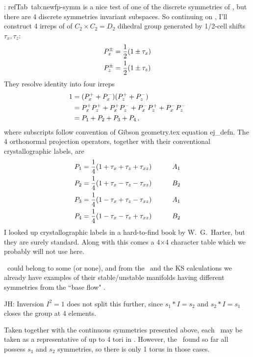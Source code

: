 :
 refTab~{tab:newfp-symm}
is a nice test of one of the discrete symmetries of \pCf, but
there are 4 discrete symmetries invariant subspaces.
So continuing on
, I'll construct 4 irreps of
of $C_2 \times C_2 = D_2$ dihedral group generated by 1/2-cell
shifts $\tau_x, \tau_z$:
\begin{align}
P_x^\pm &= \frac{1}{2}(1 \pm \tau_x)
    \nonumber \\ 
P_z^\pm &= \frac{1}{2}(1 \pm \tau_z)
\end{align}
They resolve identity into four irreps
\begin{align}
1 &= ({P}_x^+ + {P}_x^-) ({P}_z^+ + {P}_z^-)
    \nonumber \\ 
  &=  {P}_x^+ {P}_z^+
   +  {P}_x^+ {P}_z^-
   +  {P}_x^- {P}_z^+
   +  {P}_x^- {P}_z^-
    \nonumber \\ 
  &= {P}_1 + {P}_2 + {P}_3 + {P}_4
    \,,
\label{projOp:tau1}
\end{align}
where subscripts follow convention of Gibson geometry.tex
equation ej\_defn.
The 4 orthonormal projection operators, together with
their conventional crystallographic labels, are
\begin{align}
P_1 &= \frac{1}{4}({1} + \tau_x + \tau_z + \tau_{xz})
    & \qquad    A_1
    \nonumber \\ 
P_2 &= \frac{1}{4}({1} + \tau_x - \tau_z - \tau_{xz})
    & \qquad    B_2
    \nonumber \\ 
P_3 &= \frac{1}{4}({1} - \tau_x + \tau_z - \tau_{xz})
    & \qquad    A_1
    \nonumber \\ 
P_4 &= \frac{1}{4}({1} - \tau_x - \tau_z + \tau_{xz})
    & \qquad    B_2
\label{projOp:taus}
\end{align}
I looked up crystallographic labels in a hard-to-find book by
W.~G.~Harter, but they are surely standard. Along with this comes a
4$\times$4 character table which we probably will not use here.

\Eqva\ could belong to some (or none), and from the \ubranch\ and the KS
calculations
we already have examples of their stable/unstable manifolds
having different symmetries from the ``base flow" \eqv.

JH:{
Inversion  $I^2=1$ does not split this further,
since
$s_1*I = s_2$ and $s_2*I=s_1$ closes the group at 4 elements.
   }

Taken together with the continuous symmetries presented above, each \eqva\ may
be taken as a representative of up to 4 tori in \statesp . However, the \eqva\
found so far all possess $s_1$ and $s_2$ symmetries, so there is only
1 torus in those cases.


